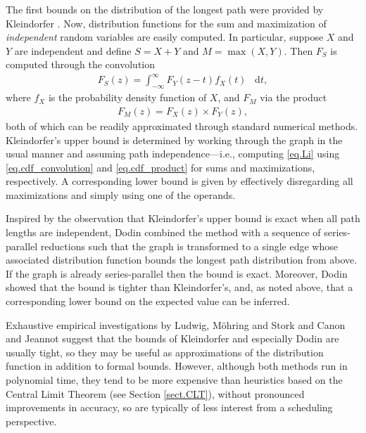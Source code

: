 \documentclass[12pt]{article}
\def\diff{\mathop{}\!\mathrm{d}}
\begin{document}
The first bounds on the distribution of the longest path were provided by Kleindorfer \cite{kle71}. Now, distribution functions for the sum and maximization of {\em independent} random variables are easily computed. In particular, suppose $X$ and $Y$ are independent and define $S = X + Y$ and $M = \max(X, Y)$. Then $F_S$ is computed through the convolution
\begin{align}
  \label{eq.cdf_convolution}
  F_S(z) = \int_{-\infty}^{\infty} F_Y(z - t) f_X(t) \; \diff t,
\end{align}
where $f_X$ is the probability density function of $X$, and $F_M$ via the product
\begin{align}
  \label{eq.cdf_product}
  F_M(z) = F_X(z) \times F_Y(z),
\end{align}
both of which can be readily approximated through standard numerical methods. Kleindorfer's upper bound is determined by working through the graph in the usual manner and assuming path independence---i.e., computing \eqref{eq.Li} using \eqref{eq.cdf_convolution} and \eqref{eq.cdf_product} for sums and maximizations, respectively. A corresponding lower bound is given by effectively disregarding all maximizations and simply using one of the operands.

Inspired by the observation that Kleindorfer's upper bound is exact when all path lengths are independent, Dodin \cite{dod85} combined the method with a sequence of series-parallel reductions such that the graph is transformed to a single edge whose associated distribution function bounds the longest path distribution from above. If the graph is already series-parallel then the bound is exact. Moreover, Dodin showed that the bound is tighter than Kleindorfer's, and, as noted above, that a corresponding lower bound on the expected value can be inferred.

Exhaustive empirical investigations by Ludwig, M{\"o}hring and Stork \cite{lud01} and Canon and Jeannot \cite{can16} suggest that the bounds of Kleindorfer and especially Dodin are usually tight, so they may be useful as approximations of the distribution function in addition to formal bounds. However, although both methods run in polynomial time, they tend to be more expensive than heuristics based on the Central Limit Theorem (see Section \ref{sect.CLT}), without pronounced improvements in accuracy, so are typically of less interest from a scheduling perspective.  

\end{document}
